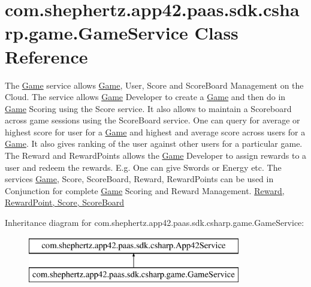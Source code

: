 \hypertarget{classcom_1_1shephertz_1_1app42_1_1paas_1_1sdk_1_1csharp_1_1game_1_1_game_service}{\section{com.\+shephertz.\+app42.\+paas.\+sdk.\+csharp.\+game.\+Game\+Service Class Reference}
\label{classcom_1_1shephertz_1_1app42_1_1paas_1_1sdk_1_1csharp_1_1game_1_1_game_service}
}


The \hyperlink{classcom_1_1shephertz_1_1app42_1_1paas_1_1sdk_1_1csharp_1_1game_1_1_game}{Game} service allows \hyperlink{classcom_1_1shephertz_1_1app42_1_1paas_1_1sdk_1_1csharp_1_1game_1_1_game}{Game}, User, Score and Score\+Board Management on the Cloud. The service allows \hyperlink{classcom_1_1shephertz_1_1app42_1_1paas_1_1sdk_1_1csharp_1_1game_1_1_game}{Game} Developer to create a \hyperlink{classcom_1_1shephertz_1_1app42_1_1paas_1_1sdk_1_1csharp_1_1game_1_1_game}{Game} and then do in \hyperlink{classcom_1_1shephertz_1_1app42_1_1paas_1_1sdk_1_1csharp_1_1game_1_1_game}{Game} Scoring using the Score service. It also allows to maintain a Scoreboard across game sessions using the Score\+Board service. One can query for average or highest score for user for a \hyperlink{classcom_1_1shephertz_1_1app42_1_1paas_1_1sdk_1_1csharp_1_1game_1_1_game}{Game} and highest and average score across users for a \hyperlink{classcom_1_1shephertz_1_1app42_1_1paas_1_1sdk_1_1csharp_1_1game_1_1_game}{Game}. It also gives ranking of the user against other users for a particular game. The Reward and Reward\+Points allows the \hyperlink{classcom_1_1shephertz_1_1app42_1_1paas_1_1sdk_1_1csharp_1_1game_1_1_game}{Game} Developer to assign rewards to a user and redeem the rewards. E.\+g. One can give Swords or Energy etc. The services \hyperlink{classcom_1_1shephertz_1_1app42_1_1paas_1_1sdk_1_1csharp_1_1game_1_1_game}{Game}, Score, Score\+Board, Reward, Reward\+Points can be used in Conjunction for complete \hyperlink{classcom_1_1shephertz_1_1app42_1_1paas_1_1sdk_1_1csharp_1_1game_1_1_game}{Game} Scoring and Reward Management. \hyperlink{classcom_1_1shephertz_1_1app42_1_1paas_1_1sdk_1_1csharp_1_1game_1_1_game_service}{Reward, Reward\+Point, Score, Score\+Board}  


Inheritance diagram for com.\+shephertz.\+app42.\+paas.\+sdk.\+csharp.\+game.\+Game\+Service\+:\begin{figure}[H]
\begin{center}
\leavevmode
\includegraphics[height=2.000000cm]{classcom_1_1shephertz_1_1app42_1_1paas_1_1sdk_1_1csharp_1_1game_1_1_game_service}
\end{center}
\end{figure}
